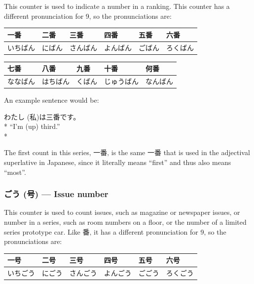 \documentclass[11pt, b5paper, twoside, openright, onecolumn]{book}
\makeatletter
\newcommand*{\rubystack}[2]{{\relscale{0.5}%
  \begin{tabular}[b]{@{}c@{}}%
    {#1}\\%
   {\textscale{2}{#2}}%
  \end{tabular}}%
}
\DeclareRobustCommand*{\ruby}[2]{%
  \mbox{%
    \setlength{\parskip}{0ex}%
    \BeginAccSupp{method=pdfstringdef,ActualText={#1}}%
      \rubystack{\phantom{#2}}{#1}%
      \llap{%
        \rubystack{#2}{\phantom{#1}}%
      }%
    \EndAccSupp{}%
  }%
}
\renewcommand*{\ruby}[2]{#2 (#1)}%
\newenvironment{exampleblock}{
\setlength{\parindent}{0.6in}
\begin{minipage}[t]{\dimexpr\textwidth-\parindent}}
{\end{minipage}}
\newenvironment{mytabular}[1]{\noindent\hspace{0.4in}
\begin{tabular}[h]{#1}}{\end{tabular}}
\makeatother
\begin{document}
This counter is used to indicate a number in a ranking. This counter has a different pronunciation for 9‚ so the pronunciations are:

\vspace{0.5cm}
\smaller
\begin{mytabular}{| l  l  l  l  l  l |}\hline 
\rule{0pt}{2.4ex}一番 & 二番 & 三番 & 四番 & 五番 & 六番\\ 
\hline
\rule{0pt}{2.4ex}いちばん & にばん & さんばん & よんばん & ごばん & ろくばん\\ 
\hline 
\end{mytabular}
\larger
\vspace{0.5cm}

\smaller
\begin{mytabular}{| l  l  l  l  l |}\hline 
\rule{0pt}{2.4ex}七番 & 八番 & 九番 & 十番 & 何番\\ 
\hline
\rule{0pt}{2.4ex}ななばん & はちばん & くばん & じゅうばん & なんばん\\ 
\hline 
\end{mytabular}
\larger
\vspace{0.5cm}



An example sentence would be:

\vspace{0.4cm}
\begin{exampleblock}
\ruby{私}{わたし}は三番です。 \\* 
“I’m (up) third.” \\* 
\end{exampleblock}
\vspace{0.2cm}

The first count in this series‚ 一番‚ is the same 一番 that is used in the adjectival superlative in Japanese‚ since it literally means “first” and thus also means “most”.

\subsubsection{\ruby{号}{ごう} — Issue number}

This counter is used to count issues‚ such as magazine or newspaper issues‚ or number in a series‚ such as room numbers on a floor‚ or the number of a limited series prototype car. Like 番‚ it has a different pronunciation for 9‚ so the pronunciations are:

\vspace{0.5cm}
\smaller
\begin{mytabular}{| l  l  l  l  l  l |}\hline 
\rule{0pt}{2.4ex}一号 & 二号 & 三号 & 四号 & 五号 & 六号\\ 
\hline
\rule{0pt}{2.4ex}いちごう & にごう & さんごう & よんごう & ごごう & ろくごう\\ 
\hline 
\end{mytabular}
\larger
\vspace{0.5cm}
\end{document}
